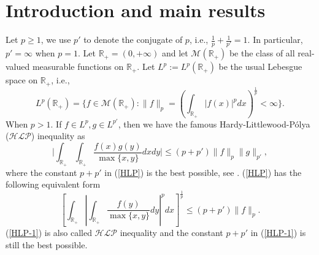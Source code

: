 \documentclass[10pt]{amsart}
\theoremstyle{definition}    %
\numberwithin{equation}{section}
\begin{document}
\section{\bf {Introduction and main results} }
Let $p\geq 1$, we use $p'$ to denote the conjugate of $p$,  i.e., $\frac{1}{p}+\frac{1}{p'}=1$. In particular, $p'=\infty$ when $p=1$. Let $\mathbb{R}_{+}=(0,+\infty)$ and let $\mathcal{M}(\mathbb{R}_{+})$ be the class of all real-valued measurable functions on $\mathbb{R}_{+}.$ Let $L^p:=L^p(\mathbb{R}_{+})$ be the usual Lebesgue space on $\mathbb{R}_{+}$, i.e.,
\begin{equation*}
L^p(\mathbb{R}_{+})=\{f\in \mathcal{M}(\mathbb{R}_{+}): \|f\|_p=(\int_{\mathbb{R}_{+}}
|f(x)|^pdx)^{\frac{1}{p}}<\infty\}.
\end{equation*}
When $p>1$. If $f \in L^p, g \in L^{p'}$,  then we have the famous Hardy-Littlewood-P\'{o}lya (${\mathcal{HLP}}$) inequality as
\begin{equation}\label{HLP}
\Big|\int_{\mathbb{R}_{+}}
\int_{\mathbb{R}_{+}}\frac{f(x)g(y)}{\max\{x, y\}}dxdy\Big|\leq (p+p')\|f\|_{p}\|g\|_{p'},
\end{equation}
where the constant $p+p'$ in (\ref{HLP}) is the best possible, see \cite{HLP}. (\ref{HLP}) has the following equivalent form
\begin{equation}\label{HLP-1}
\left[\int_{\mathbb{R}_{+}}
\left|\int_{\mathbb{R}_{+}}\frac{f(y)}{\max\{x,y\}}dy\right|^p
dx\right]^{\frac{1}{p}}\leq (p+p')\|f\|_{p}.
\end{equation}
(\ref{HLP-1}) is also called ${\mathcal{HLP}}$ inequality and the constant $p+p'$ in (\ref{HLP-1}) is still the best possible.  
\end{document}
